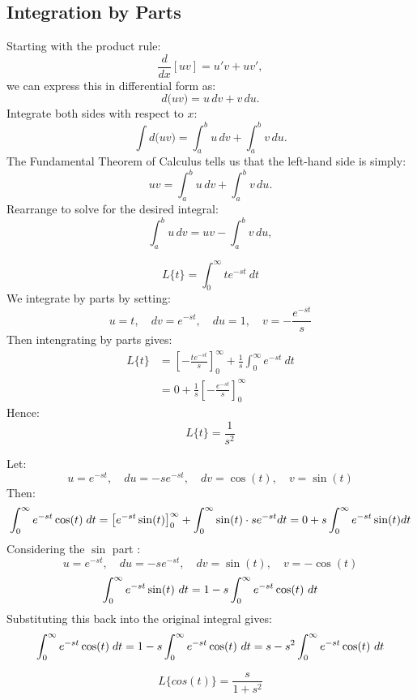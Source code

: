 \documentclass[a4paper, 10pt]{article}
\begin{document}
\subsection{Integration by Parts}
Starting with the product rule:
$$
  \frac{d}{dx}[uv] = u'v + uv',
$$
we can express this in differential form as:
$$
  d\bigl(uv\bigr) = u\,dv + v\,du.
$$
Integrate both sides with respect to \(x\):
$$
  \int d\bigl(uv\bigr) = \int_a^b u\,dv + \int_a^b v\,du.
$$
The Fundamental Theorem of Calculus tells us that the left-hand side is simply:
$$
  uv = \int_a^b u\,dv + \int_a^b v\,du.
$$
Rearrange to solve for the desired integral:
$$
  \int_a^b u\,dv = uv - \int_a^b v\,du,
$$


\begin{examplebox}[Use integration by parts to find the Laplace of $f(t) = t$]
  $$L\{t\} = \int_0^\infty te^{-st} \ dt$$
  We integrate by parts by setting:
  $$u = t, \quad dv = e^{-st}, \quad du = 1, \quad v = -\frac{e^{-st}}{s}$$
  Then intengrating by parts gives:
  \begin{align*}
    L\{t\} & = \left [ -\frac{te^{-st}}{s} \right ]_0^\infty + \frac{1}{s}\int_0^\infty e^{-st} \ dt \\
           & = 0 + \frac{1}{s}\left [ -\frac{e^{-st}}{s} \right ]_0^\infty
  \end{align*}
  Hence:
  $$L\{t\} = \frac{1}{s^2}$$
\end{examplebox}

\begin{examplebox}[Use integration by parts to find the Laplace of $f(t) = \cos(t)$]
  Let:
  $$u = e^{-st}, \quad du = -se^{-st}, \quad dv = \cos(t), \quad v = \sin(t)$$
  Then:
  $$
    \int_0^{\infty} e^{-st} \cos(t)\; dt = \left[ e^{-st} \sin(t) \right]_0^\infty + \int_0^{\infty} \sin(t)\cdot se^{-st} dt = 0 + s\int_0^{\infty} e^{-st} \sin(t) dt
  $$
  Considering the $\sin$ part :
  $$u = e^{-st}, \quad du = -se^{-st}, \quad dv = \sin(t), \quad v = -\cos(t)$$
  $$\int_0^{\infty} e^{-st} \sin(t)\ dt = 1 - s \int_0^{\infty} e^{-st} \cos(t) \ dt$$
  Substituting this back into the original integral gives:
  $$
    \intinf e^{-st} \cos(t)\; dt = 1 - s\intinf e^{-st} \cos(t)\ dt = s - s^2\intinf e^{-st} \cos(t)\ dt \\
  $$

  $$L\{cos(t)\}= \dfrac{s}{1+s^2}$$
\end{examplebox}

\pagebreak
\end{document}

